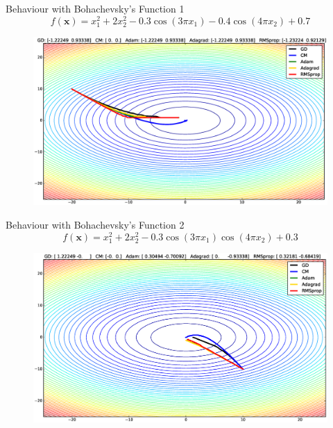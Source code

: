\documentclass[10pt]{beamer}
\newcommand{\xbold}{\mathbf{x}}
\begin{document}
\begin{frame}{Behaviour with Bohachevsky's Function 1}
\begin{equation}
\label{B1}
f(\xbold) = x_{1}^{2} + 2x_{2}^{2} - 0.3\cos(3\pi x_{1}) - 0.4\cos(4\pi x_{2}) + 0.7
\end{equation}
\begin{figure}
\centering
\includegraphics[width=\linewidth]{./images/B1.eps}
\end{figure}
\end{frame}

\begin{frame}{Behaviour with Bohachevsky's Function 2}
\begin{equation}
\label{B2}
f(\xbold) = x_{1}^{2} + 2x_{2}^{2} - 0.3\cos(3\pi x_{1})\cos(4\pi x_{2}) + 0.3
\end{equation}
\begin{figure}
\centering
\includegraphics[width=\linewidth]{./images/B2.eps}
\end{figure}
\end{frame}
\end{document}
